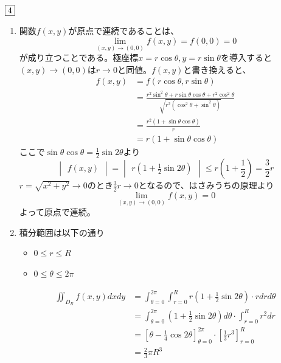 \documentclass[dvipdfmx]{jsreport}
\newcounter{num}[section]
\begin{document}
\begin{answer} %
	$\fbox{4}$
\begin{enumerate}
	\item 関数$f(x, y)$が原点で連続であることは、
\begin{equation*}
	\lim_{(x, y)\to (0, 0)} f(x, y)= f(0, 0)= 0
\end{equation*}
	が成り立つことである。極座標$x= r\cos{\theta}, y= r\sin{\theta}$を導入すると$(x, y)\to (0, 0)$は$r\to 0$と同値。$f(x, y)$と書き換えると、
\begin{align*}
	f(x, y)
	&= f(r\cos{\theta}, r\sin{\theta})\\
	&= \frac{r^2\sin^2{\theta}+ r\sin{\theta}\cos{\theta}+ r^2\cos^2{\theta}}{\sqrt{r^2(\cos^2{\theta}+ \sin^2{\theta})}}\\
	&= \frac{r^2(1+ \sin{\theta}\cos{\theta})}{r}\\
	&= r(1+ \sin{\theta}\cos{\theta})
\end{align*}
	ここで$\sin{\theta}\cos{\theta}= \frac{1}{2}\sin{2\theta}$より
\begin{equation*}
	\begin{vmatrix}f(x, y)\end{vmatrix}= \begin{vmatrix}r\left(1+ \frac{1}{2}\sin{2\theta}\right)\end{vmatrix}\le r\left(1+ \frac{1}{2}\right)= \frac{3}{2}r
\end{equation*}
	$r= \sqrt{x^2+ y^2}\to 0$のとき$\frac{3}{2}r\to 0$となるので、はさみうちの原理より
\begin{equation*}
	\lim_{(x, y)\to (0, 0)} f(x, y)= 0
\end{equation*}
	よって原点で連続。

	\item 積分範囲は以下の通り
\begin{itemize}
	\item $0\le r\le R$
	\item $0\le \theta\le 2\pi$
\end{itemize}
\begin{align*}
	\iint_{D_R} f(x, y) dxdy
	&= \int_{\theta= 0}^{2\pi}\int_{r= 0}^R r\left(1+ \frac{1}{2}\sin{2\theta}\right)\cdot rdrd\theta\\
	&= \int_{\theta= 0}^{2\pi} \left(1+ \frac{1}{2}\sin{2\theta}\right)d\theta\cdot \int_{r= 0}^R r^2 dr\\
	&= \left[\theta- \frac{1}{4}\cos{2\theta}\right]_{\theta= 0}^{2\pi}\cdot \left[\frac{1}{3}r^3\right]_{r= 0}^ R\\
	&= \frac{2}{3}\pi R^3
\end{align*}
\end{enumerate}
\end{answer}
\end{document}

